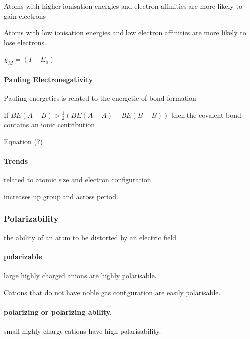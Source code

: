 \documentclass[]{article}
\let\oldparagraph\paragraph
\renewcommand{\paragraph}[1]{\oldparagraph{#1}\mbox{}}
\begin{document}
Atoms with higher ionisation energies and electron affinities are more
likely to gain electrons

Atoms with low ionisation energies and low electron affinities are more
likely to lose electrons.

\(\chi_{M}=(I+E_{a})\)

\hypertarget{pauling-electronegativity}{%
\paragraph{Pauling Electronegativity}\label{pauling-electronegativity}}

Pauling energetics is related to the energetic of bond formation

If \(BE(A-B)>\frac{1}{2}(BE(A-A)+BE(B-B))\) then the covalent bond
contains an ionic contribution

Equation (?)

\hypertarget{trends-3}{%
\paragraph{Trends}\label{trends-3}}

related to atomic size and electron configuration

increases up group and across period.

\hypertarget{polarizability}{%
\subsubsection{Polarizability}\label{polarizability}}

the ability of an atom to be distorted by an electric field

\hypertarget{polarizable}{%
\paragraph{polarizable}\label{polarizable}}

large highly charged anions are highly polarisable.

Cations that do not have noble gas configuration are easily polarisable.

\hypertarget{polarizing-or-polarizing-ability.}{%
\paragraph{polarizing or polarizing
ability.}\label{polarizing-or-polarizing-ability.}}

small highly charge cations have high polarisability.
\end{document}
